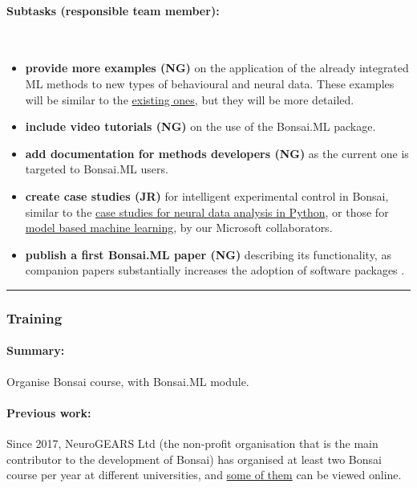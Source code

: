 \paragraph{Subtasks (responsible team member):}\mbox{}\\
\begin{itemize}

    \item\textbf{provide more examples (NG)} on the application of the already
        integrated ML methods to new types of behavioural and neural data.
        These examples will be similar to the
        \href{https://bonsai-rx.org/machinelearning/examples/README.html}{existing
        ones}, but they will be more detailed.

    \item\textbf{include video tutorials (NG)} on the use of the Bonsai.ML
        package.

    \item\textbf{add documentation for methods developers (NG)} as the current one is
        targeted to Bonsai.ML users.

    \item\textbf{create case studies (JR)} for intelligent experimental control
        in Bonsai, similar to the
        \href{https://mark-kramer.github.io/Case-Studies-Python/intro.html}{case
        studies for neural data analysis in Python}, or those for
        \href{https://mbmlbook.com/index.html}{model based machine learning},
        by our Microsoft collaborators.

    \item\textbf{publish a first Bonsai.ML paper (NG)} describing its functionality, as
        companion papers substantially increases the adoption of software
        packages \citep{lopesEtAl15,guilbeaultEtAl21}.

\end{itemize}

\noindent\rule{\textwidth}{1pt}
\subsubsection*{Training}

\paragraph{Summary:} Organise Bonsai course, with Bonsai.ML module.

\paragraph{Previous work:} Since 2017, NeuroGEARS Ltd (the non-profit
organisation that is the main contributor to the development of Bonsai) has
organised at least two Bonsai course per year at different universities, and
\href{https://bonsai-rx.org/learn/}{some of them} can be viewed
online.

